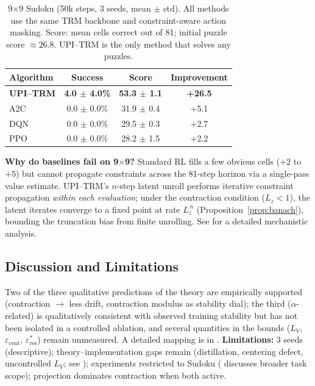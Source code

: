 \documentclass{article}
\theoremstyle{plain}
\theoremstyle{definition}
\theoremstyle{remark}
\begin{document}
{\begin{table}[t]
\caption{9$\times$9 Sudoku (50k steps, 3 seeds, mean $\pm$ std). All methods use the same TRM backbone and constraint-aware action masking. Score: mean cells correct out of 81; initial puzzle score ${\approx}26.8$. UPI--TRM is the only method that solves any puzzles.}
\label{tab:9x9_results}
\centering
\footnotesize
\setlength{\tabcolsep}{4pt}
\renewcommand{\arraystretch}{0.95}
\begin{tabular}{@{}lccc@{}}
\toprule
Algorithm & Success & Score & Improvement \\
\midrule
\textbf{UPI--TRM} & \textbf{4.0 $\pm$ 4.0\%} & \textbf{53.3 $\pm$ 1.1} & \textbf{+26.5} \\
A2C & 0.0 $\pm$ 0.0\% & 31.9 $\pm$ 0.4 & +5.1 \\
DQN & 0.0 $\pm$ 0.0\% & 29.5 $\pm$ 0.3 & +2.7 \\
PPO & 0.0 $\pm$ 0.0\% & 28.2 $\pm$ 1.5 & +2.2 \\
\bottomrule
\end{tabular}
\end{table}

\textbf{Why do baselines fail on 9$\times$9?}
Standard RL fills a few obvious cells ($+2$ to $+5$) but cannot propagate constraints across the 81-step horizon via a single-pass value estimate.
UPI--TRM's $n$-step latent unroll performs iterative constraint propagation \emph{within each evaluation}; under the contraction condition ($L_z < 1$), the latent iterates converge to a fixed point at rate $L_z^{\,n}$ (Proposition~\ref{prop:banach}), bounding the truncation bias from finite unrolling.
See  for a detailed mechanistic analysis.

\subsection{Discussion and Limitations}
\label{sec:discussion}

Two of the three qualitative predictions of the theory are empirically supported (contraction $\to$ less drift, contraction modulus as stability dial); the third ($\alpha$-related) is qualitatively consistent with observed training stability but has not been isolated in a controlled ablation, and several quantities in the bounds ($L_V$, $\varepsilon_{\mathrm{cent}}$, $\varepsilon_{\mathrm{res}}^*$) remain unmeasured.
A detailed mapping is in .
\textbf{Limitations:}
3 seeds (descriptive);
theory--implementation gaps remain (distillation, centering defect, uncontrolled $L_V$; see );
experiments restricted to Sudoku ( discusses broader task scope);
projection dominates contraction when both active.
}
\end{document}
